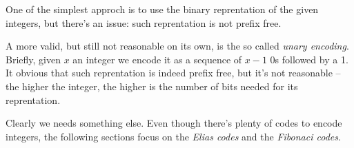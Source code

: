 \documentclass{subfiles}
\begin{document}
    One of the simplest approch is to use the binary reprentation of the given integers,
    but there's an issue: such reprentation is not prefix free.

    A more valid, but still not reasonable on its own, is the so called \emph{unary encoding}.
    Briefly, given \(x\) an integer we encode it as a sequence of \(x - 1\) 0s followed by a 1.
    It obvious that such reprentation is indeed prefix free, 
        but it's not reasonable -- the higher the integer, 
        the higher is the number of bits needed for its reprentation. 
    
    Clearly we needs something else. Even though there's plenty of codes to encode integers, 
    the following sections focus on the \emph{Elias codes} and the \emph{Fibonaci codes}. 
\end{document}

